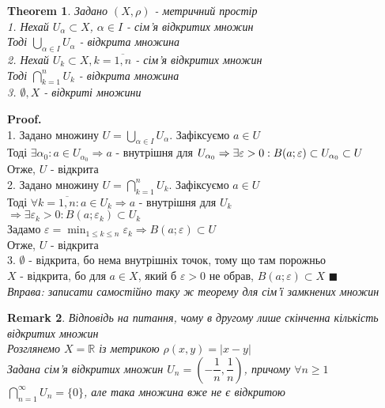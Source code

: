 \documentclass[a4paper, 14pt]{extarticle}
\def\huge{\displaystyle}
\theoremstyle{theoremdd}
\newtheorem{theorem}{Theorem}[subsection]
\theoremstyle{theoremdd}
\theoremstyle{theoremdd}
\theoremstyle{theoremdd}
\theoremstyle{theoremdd}
\theoremstyle{theoremdd}
\newtheorem{remark}[theorem]{Remark}
\theoremstyle{theoremdd}
\theoremstyle{theoremdd}
\newenvironment{pf}{\vspace*{-3mm} \textbf{Proof. \\}}{$\blacksquare$}
\begin{document}
\begin{theorem} Задано $(X,\rho)$ - метричний простір\\
1. Нехай $U_{\alpha} \subset X$, $\alpha \in I$ - сім'я відкритих множин \\ Тоді $\huge \bigcup_{\alpha \in I} U_{\alpha}$ - відкрита множина\\
2. Нехай $U_k \subset X, k = \overline{1,n}$ - сім'я відкритих множин \\ Тоді $\huge \bigcap_{k=1}^n U_k$ - відкрита множина\\
3. $\emptyset, X$ - відкриті множини
\end{theorem}

\begin{pf}
1. Задано множину $U = \huge \bigcup_{\alpha \in I} U_{\alpha}$. Зафіксуємо $a \in U$\\
Тоді $\exists \alpha_0: a \in U_{\alpha_0} \Rightarrow a$ - внутрішня для $U_{\alpha_0} \\ \Rightarrow \exists \varepsilon > 0: B(a;\varepsilon) \subset U_{\alpha_0} \subset U$\\
Отже, $U$ - відкрита
\bigskip \\
2. Задано множину $U = \huge \bigcap_{k=1}^n U_k$. Зафіксуємо $a \in U$\\
Тоді $\forall k = \overline{1,n}: a \in U_k \Rightarrow a$ - внутрішня для $U_k$\\
$\Rightarrow \exists \varepsilon_k > 0: B(a;\varepsilon_k) \subset U_k$\\
Задамо $\varepsilon = \huge\min_{1 \leq k \leq n} \varepsilon_k \Rightarrow B(a;\varepsilon) \subset U$\\
Отже, $U$ - відкрита
\bigskip \\
3. $\emptyset$ - відкрита, бо нема внутрішніх точок, тому що там порожньо\\
\text{} \hspace{0.1cm} $X$ - відкрита, бо для $a \in X$, який б $\varepsilon > 0$ не обрав, $B(a;\varepsilon) \subset X$
\end{pf} \\
\textit{Вправа: записати самостійно таку ж теорему для сім'ї замкнених множин}

\begin{remark}
Відповідь на питання, чому в другому лише скінченна кількість відкритих множин\\
Розглянемо $X = \mathbb{R}$ із метрикою $\rho(x,y) = |x-y|$\\
Задана сім'я відкритих множин $U_n = \left( -\dfrac{1}{n}, \dfrac{1}{n} \right)$, причому $\forall n \geq 1$\\
$\huge\bigcap_{n=1}^\infty U_n = \{0\}$, але така множина вже не є відкритою
\end{remark}
\end{document}
